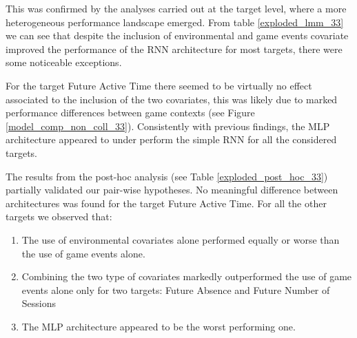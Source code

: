 This was confirmed by the analyses carried out at the target level, where a more heterogeneous performance landscape emerged. From table \ref{exploded_lmm_33} we can see that despite the inclusion of environmental and game events covariate improved the performance of the RNN architecture for most targets, there were some noticeable exceptions. 

For the target Future Active Time there seemed to be virtually no effect associated to the inclusion of the two covariates, this was likely due to marked performance differences between game contexts (see Figure \ref{model_comp_non_coll_33}). Consistently with previous findings, the MLP architecture appeared to under perform the simple RNN for all the considered targets.   





The results from the post-hoc analysis (see Table \ref{exploded_post_hoc_33}) partially validated our pair-wise hypotheses. No meaningful difference between architectures was found for the target Future Active Time. For all the other targets we observed that:

\begin{enumerate}
    \item The use of environmental covariates alone performed equally or worse than the use of game events alone.
    \item Combining the two type of covariates markedly outperformed the use of game events alone only for two targets: Future Absence and Future Number of Sessions
    \item The MLP architecture appeared to be the worst performing one.
\end{enumerate}

